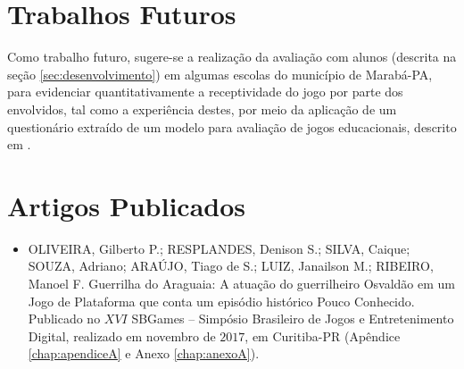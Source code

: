 \section{Trabalhos Futuros}

Como trabalho futuro, sugere-se a realização da avaliação com alunos (descrita na seção \ref{sec:desenvolvimento}) em algumas escolas do município de Marabá-PA, para evidenciar quantitativamente a receptividade do jogo por parte dos envolvidos, tal como a experiência destes, por meio da aplicação de um questionário extraído de um modelo para avaliação de jogos educacionais, descrito em .

\section{Artigos Publicados}

\begin{itemize}
	\item OLIVEIRA, Gilberto P.; RESPLANDES, Denison S.; SILVA, Caique; SOUZA, Adriano; ARAÚJO, Tiago de S.; LUIZ, Janailson M.; RIBEIRO, Manoel F. Guerrilha do Araguaia: A atuação do guerrilheiro Osvaldão em um Jogo de Plataforma que conta um episódio histórico Pouco Conhecido. Publicado no $XVI$ SBGames -- Simpósio Brasileiro de Jogos e Entretenimento Digital, realizado em novembro de $2017$, em Curitiba-PR (Apêndice \ref*{chap:apendiceA} e Anexo \ref*{chap:anexoA}).
	
\end{itemize}

